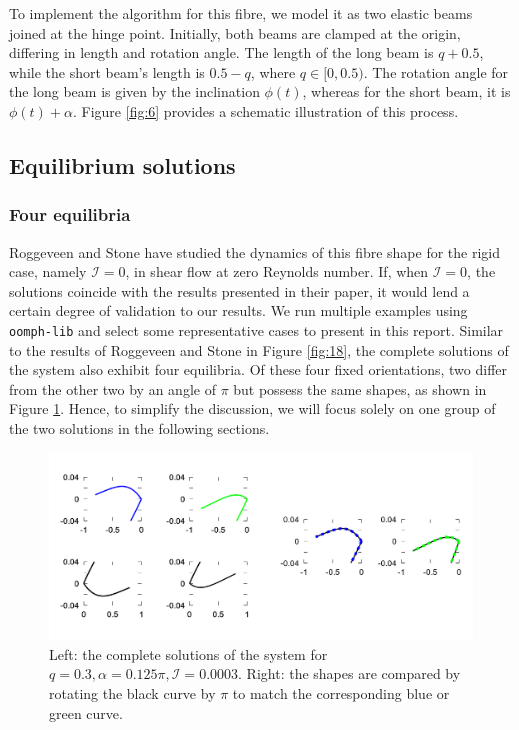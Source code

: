 \documentclass[lineno]{JFM-FLM_Au}
\begin{document}
To implement the algorithm for this fibre, we model it as two elastic beams joined at the hinge point. Initially, both beams are clamped at the origin, differing in length and rotation angle. The length of the long beam is $q+0.5$, while the short beam's length is $0.5-q$, where $q \in [0,0.5)$. The rotation angle for the long beam is given by the inclination $\phi(t)$, whereas for the short beam, it is $\phi(t)+\alpha$. Figure \ref{fig:6} provides a schematic illustration of this process. 


\subsection{Equilibrium solutions}
\subsubsection{Four equilibria}
Roggeveen and Stone have studied the dynamics of this fibre shape for the rigid case, namely $\mathcal{I}=0$, in shear flow at zero Reynolds number. If, when $\mathcal{I}=0$, the solutions coincide with the results presented in their paper, it would lend a certain degree of validation to our results.
We run multiple examples using \texttt{oomph-lib} and select some representative cases to present in this report. Similar to the results of Roggeveen and Stone in Figure \ref{fig:18}, the complete solutions of the system also exhibit four equilibria. Of these four fixed orientations, two differ from the other two by an angle of $\pi$ but possess the same shapes, as shown in Figure \ref{fig:20}. Hence, to simplify the discussion, we will focus solely on one group of the two solutions in the following sections.
\begin{figure}[!h]
	\begin{center}
		\includegraphics[width=1\textwidth]{plot/four_solutions2.png}
		\caption{Left: the complete solutions of the system for $q=0.3, \alpha=0.125\pi, \mathcal{I}=0.0003$. Right: the shapes are compared by rotating the black curve by $\pi$ to match the corresponding blue or green curve.}
		\label{fig:20}
	\end{center}
\end{figure}
\end{document}
